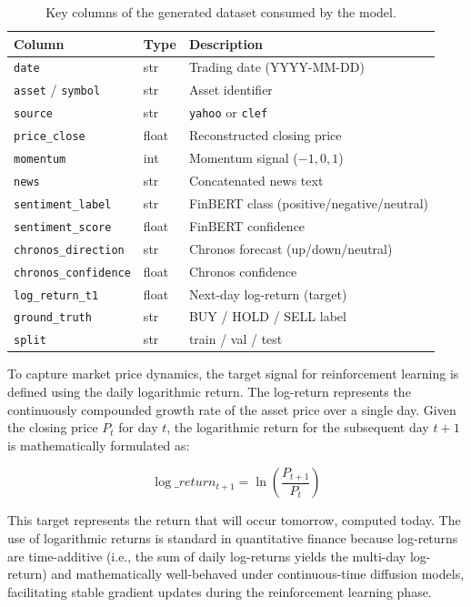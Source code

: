     \begin{table}[H]
    \centering
    \caption{Key columns of the generated dataset consumed by the model.}
    \label{tab:dataset_columns}
    \begin{tabular}{lll}
    \toprule
    \textbf{Column} & \textbf{Type} & \textbf{Description} \\
    \midrule
    \texttt{date} & str & Trading date (YYYY-MM-DD) \\
    \texttt{asset} / \texttt{symbol} & str & Asset identifier \\
    \texttt{source} & str & \texttt{yahoo} or \texttt{clef} \\
    \texttt{price\_close} & float & Reconstructed closing price \\
    \texttt{momentum} & int & Momentum signal ($-1,0,1$) \\
    \texttt{news} & str & Concatenated news text \\
    \texttt{sentiment\_label} & str & FinBERT class (positive/negative/neutral) \\
    \texttt{sentiment\_score} & float & FinBERT confidence \\
    \texttt{chronos\_direction} & str & Chronos forecast (up/down/neutral) \\
    \texttt{chronos\_confidence} & float & Chronos confidence \\
    \texttt{log\_return\_t1} & float & Next-day log-return (target) \\
    \texttt{ground\_truth} & str & BUY / HOLD / SELL label \\
    \texttt{split} & str & train / val / test \\
    \bottomrule
    \end{tabular}

    \end{table}
    
    To capture market price dynamics, the target signal for reinforcement learning is defined using the daily logarithmic return. The log-return represents the continuously compounded growth rate of the asset price over a single day. Given the closing price $P_t$ for day $t$, the logarithmic return for the subsequent day $t+1$ is mathematically formulated as:
    
    \begin{equation}
        \log\_return_{t+1} = \ln\left(\frac{P_{t+1}}{P_t}\right)
    \end{equation}
    
    This target represents the return that will occur tomorrow, computed today. The use of logarithmic returns is standard in quantitative finance because log-returns are time-additive (i.e., the sum of daily log-returns yields the multi-day log-return) and mathematically well-behaved under continuous-time diffusion models, facilitating stable gradient updates during the reinforcement learning phase.
    
